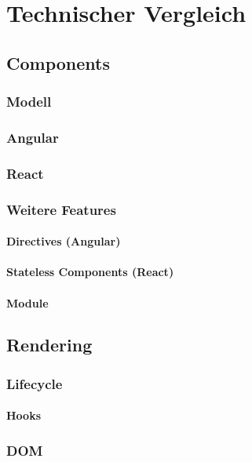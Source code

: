 \chapter{Technischer Vergleich}

\section{Components}

\subsection{Modell}

\subsection{Angular}

\subsection{React}

\subsection{Weitere Features}
\subsubsection{Directives (Angular)}
\subsubsection{Stateless Components (React)}
\subsubsection{Module}

\section{Rendering}

\subsection{Lifecycle}
\subsubsection{Hooks}

\subsection{DOM}
